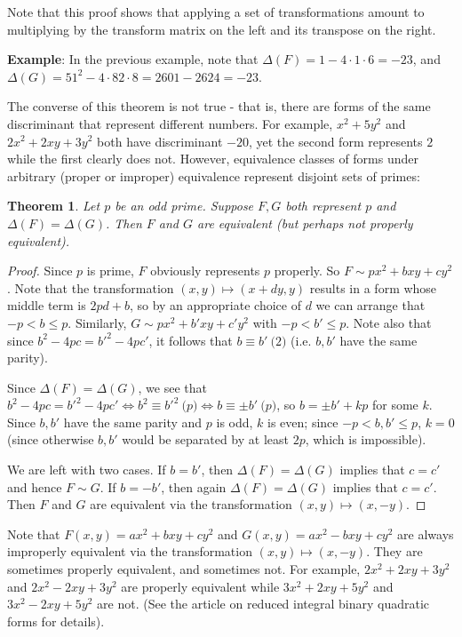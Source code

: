 \documentclass[12pt]{article}
\newtheorem{thm}{Theorem}
\theoremstyle{definition}
\begin{document}
Note that this proof shows that applying a set of transformations amount to multiplying by the transform matrix on the left and its transpose on the right.

\textbf{Example}: In the previous example, note that $\Delta(F) = 1-4\cdot 1\cdot 6=-23$, and $\Delta(G)=51^2-4\cdot 82\cdot 8 = 2601-2624=-23$.

The converse of this theorem is not true - that is, there are forms of the same discriminant that represent different numbers. For example, $x^2+5y^2$ and $2x^2+2xy+3y^2$ both have discriminant $-20$, yet the second form represents $2$ while the first clearly does not. However, equivalence classes of forms under arbitrary (proper or improper) equivalence represent disjoint sets of primes:

\begin{thm} Let $p$ be an odd prime. Suppose $F,G$ both represent $p$ and $\Delta(F)=\Delta(G)$. Then $F$ and $G$ are equivalent (but perhaps not properly equivalent).
\end{thm}
\begin{proof}
Since $p$ is prime, $F$ obviously represents $p$ properly. So $F\sim px^2+bxy+cy^2$. Note that the transformation $(x,y)\mapsto(x+dy,y)$ results in a form whose middle term is $2pd+b$, so by an appropriate choice of $d$ we can arrange that $-p< b\leq p$. Similarly, $G\sim px^2+b'xy+c'y^2$ with $-p< b'\leq p$. Note also that since $b^2-4pc=b'^2-4pc'$, it follows that $b\equiv b'\pod 2$ (i.e. $b,b'$ have the same parity).

Since $\Delta(F)=\Delta(G)$, we see that $b^2-4pc=b'^2-4pc'\Leftrightarrow b^2\equiv b'^2\pod p\Leftrightarrow b\equiv \pm b'\pod p$, so $b=\pm b'+kp$ for some $k$. Since $b,b'$ have the same parity and $p$ is odd, $k$ is even; since $-p<b,b'\leq p$, $k=0$ (since otherwise $b,b'$ would be separated by at least $2p$, which is impossible).

We are left with two cases. If $b=b'$, then $\Delta(F) = \Delta(G)$ implies that $c=c'$ and hence $F\sim G$. If $b=-b'$, then again $\Delta(F) = \Delta(G)$ implies that $c=c'$. Then $F$ and $G$ are equivalent via the transformation $(x,y)\mapsto (x,-y)$.
\end{proof}

Note that $F(x,y)=ax^2+bxy+cy^2$ and $G(x,y)=ax^2-bxy+cy^2$ are always improperly equivalent via the transformation $(x,y)\mapsto (x,-y)$. They are sometimes properly equivalent, and sometimes not. For example, $2x^2 + 2xy + 3y^2$ and  $2x^2 - 2xy + 3y^2$ are properly equivalent while $3x^2+ 2xy + 5y^2$ and  $3x^2- 2xy + 5y^2$ are not. (See the article on reduced integral binary quadratic forms for details).
\end{document}
